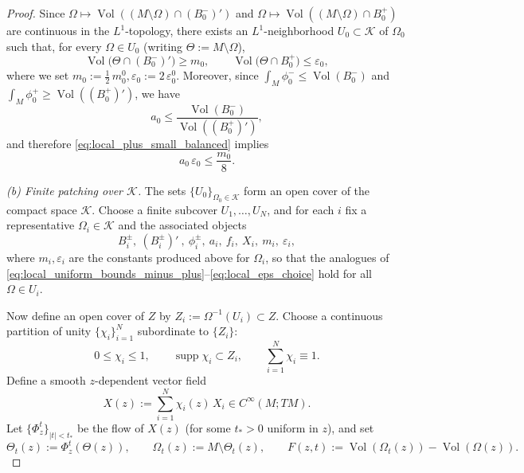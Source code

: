 \documentclass[12pt,english]{article}
\theoremstyle{definition}
\begin{document}
\begin{proof}
Since $\Omega\mapsto \operatorname{Vol}((M\setminus\Omega)\cap (B_0^-)')$ and $\Omega\mapsto \operatorname{Vol}((M\setminus\Omega)\cap B_0^+)$
are continuous in the $L^1$-topology, there exists an $L^1$-neighborhood $U_0\subset\mathcal K$ of $\Omega_0$ such that,
for every $\Omega\in U_0$ (writing $\Theta:=M\setminus\Omega$),
\begin{equation}\label{eq:local_uniform_bounds_minus_plus}
\operatorname{Vol}\bigl(\Theta\cap (B_0^-)'\bigr)\ge m_0,
\qquad
\operatorname{Vol}\bigl(\Theta\cap B_0^+\bigr)\le \varepsilon_0,
\end{equation}
where we set $m_0:=\frac12\,m_0^0, \varepsilon_0:=2\,\varepsilon_0^0$. Moreover, since $\int_M\phi_0^-\le \operatorname{Vol}(B_0^-)$ and $\int_M\phi_0^+\ge \operatorname{Vol}((B_0^+)')$, we have
\[
a_0\le \frac{\operatorname{Vol}(B_0^-)}{\operatorname{Vol}((B_0^+)')},
\]
and therefore \eqref{eq:local_plus_small_balanced} implies
\begin{equation}\label{eq:local_eps_choice}
a_0\,\varepsilon_0\le \frac{m_0}{8}.
\end{equation}

\smallskip
\noindent\emph{(b) Finite patching over $\mathcal K$.}
The sets $\{U_0\}_{\Omega_0\in\mathcal K}$ form an open cover of the compact space $\mathcal K$.
Choose a finite subcover $U_1,\dots,U_N$, and for each $i$ fix a representative $\Omega_i\in\mathcal K$ and the associated objects
\[
B_i^\pm,\ (B_i^\pm)'\ ,\ \phi_i^\pm,\ a_i,\ f_i,\ X_i,\ m_i,\ \varepsilon_i,
\]
where $m_i,\varepsilon_i$ are the constants produced above for $\Omega_i$, so that the analogues of
\eqref{eq:local_uniform_bounds_minus_plus}--\eqref{eq:local_eps_choice} hold for all $\Omega\in U_i$.

Now define an open cover of $Z$ by $Z_i:=\Omega^{-1}(U_i)\subset Z$.
Choose a continuous partition of unity $\{\chi_i\}_{i=1}^N$ subordinate to $\{Z_i\}$:
\[
0\le \chi_i\le 1,\qquad \operatorname{supp} \chi_i\subset Z_i,\qquad \sum_{i=1}^N \chi_i\equiv 1.
\]
Define a smooth $z$-dependent vector field
\[
X(z):=\sum_{i=1}^N \chi_i(z)\,X_i\in C^\infty(M;TM).
\]
Let $\{\Phi_z^t\}_{|t|<t_\ast}$ be the flow of $X(z)$ (for some $t_\ast>0$ uniform in $z$),
and set
\[
\Theta_t(z):=\Phi_z^t(\Theta(z)),\qquad \Omega_t(z):=M\setminus \Theta_t(z),\qquad
F(z,t):=\operatorname{Vol}(\Omega_t(z))-\operatorname{Vol}(\Omega(z)).
\]


\end{proof}
\end{document}

